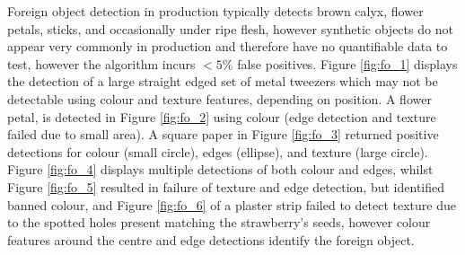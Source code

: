 \documentclass[fleqn,twoside,12pt]{report}
\begin{document}
Foreign object detection in production typically detects brown calyx, flower petals, sticks, and occasionally under ripe flesh, however synthetic objects do not appear very commonly in production and therefore have no quantifiable data to test, however the algorithm incurs $<5\%$ false positives. Figure \ref{fig:fo_1} displays the detection of a large straight edged set of metal tweezers which may not be detectable using colour and texture features, depending on position. A flower petal, is detected in Figure \ref{fig:fo_2} using colour (edge detection and texture failed due to small area). A square paper in Figure \ref{fig:fo_3} returned positive detections for colour (small circle), edges (ellipse), and texture (large circle). Figure \ref{fig:fo_4} displays multiple detections of both colour and edges, whilst Figure \ref{fig:fo_5} resulted in failure of texture and edge detection, but identified banned colour, and Figure \ref{fig:fo_6} of a plaster strip failed to detect texture due to the spotted holes present matching the strawberry's seeds, however colour features around the centre and edge detections identify the foreign object. 
\end{document}
